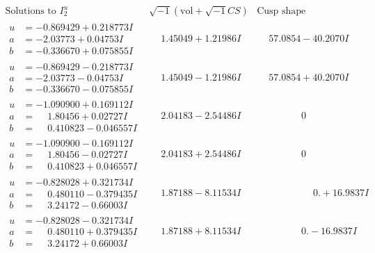 \documentclass[1p]{elsarticle_modified}
\theoremstyle{definition}
\newcommand{\I}{\sqrt{-1}}
\begin{document}
$$\begin{array}{c|c|c}  
\text{Solutions to }I^u_{2}& \I (\text{vol} + \sqrt{-1}CS) & \text{Cusp shape}\\
 \hline 
\begin{aligned}
u &= -0.869429 + 0.218773 I \\
a &= -2.03773 + 0.04753 I \\
b &= -0.336670 + 0.075855 I\end{aligned}
 & \phantom{-}1.45049 + 1.21986 I & \phantom{-}57.0854 - 40.2070 I \\ \hline\begin{aligned}
u &= -0.869429 - 0.218773 I \\
a &= -2.03773 - 0.04753 I \\
b &= -0.336670 - 0.075855 I\end{aligned}
 & \phantom{-}1.45049 - 1.21986 I & \phantom{-}57.0854 + 40.2070 I \\ \hline\begin{aligned}
u &= -1.090900 + 0.169112 I \\
a &= \phantom{-}1.80456 + 0.02727 I \\
b &= \phantom{-}0.410823 - 0.046557 I\end{aligned}
 & \phantom{-}2.04183 - 2.54486 I & \phantom{-0.000000 } 0 \\ \hline\begin{aligned}
u &= -1.090900 - 0.169112 I \\
a &= \phantom{-}1.80456 - 0.02727 I \\
b &= \phantom{-}0.410823 + 0.046557 I\end{aligned}
 & \phantom{-}2.04183 + 2.54486 I & \phantom{-0.000000 } 0 \\ \hline\begin{aligned}
u &= -0.828028 + 0.321734 I \\
a &= \phantom{-}0.480110 - 0.379435 I \\
b &= \phantom{-}3.24172 - 0.66003 I\end{aligned}
 & \phantom{-}1.87188 - 8.11534 I & \phantom{-0.000000 -}0. + 16.9837 I \\ \hline\begin{aligned}
u &= -0.828028 - 0.321734 I \\
a &= \phantom{-}0.480110 + 0.379435 I \\
b &= \phantom{-}3.24172 + 0.66003 I\end{aligned}
 & \phantom{-}1.87188 + 8.11534 I & \phantom{-0.000000 } 0. - 16.9837 I \\ \hline\begin{aligned}

\end{aligned}
\end{array}$$
\end{document}
